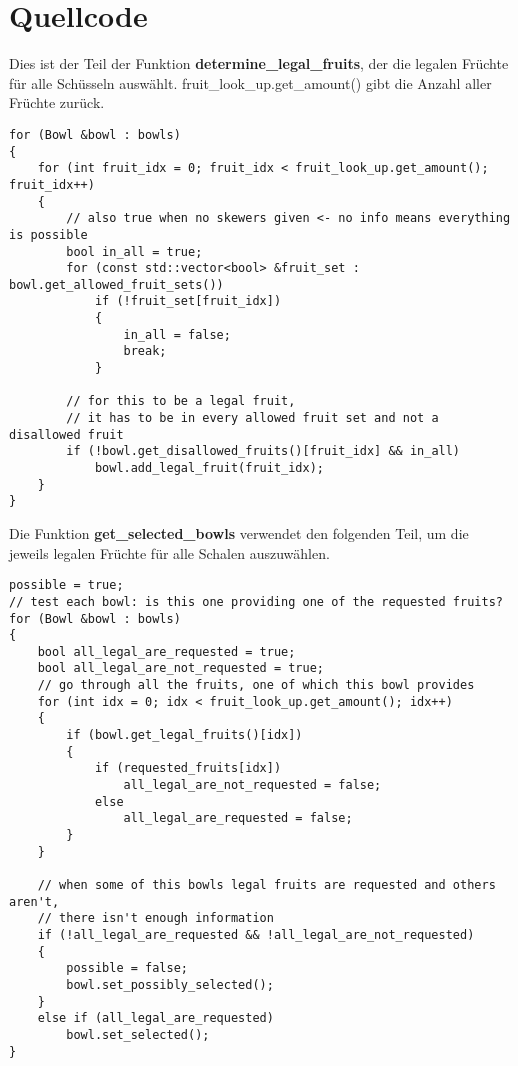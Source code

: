 \documentclass[a4paper,10pt,ngerman]{scrartcl}
\begin{document}
\section{Quellcode}
Dies ist der Teil der Funktion \textbf{determine\_legal\_fruits}, der die legalen Früchte für alle Schüsseln auswählt.
\glqq fruit\_look\_up.get\_amount()\grqq{} gibt die Anzahl aller Früchte zurück.
\begin{lstlisting}
for (Bowl &bowl : bowls)
{
    for (int fruit_idx = 0; fruit_idx < fruit_look_up.get_amount(); fruit_idx++)
    {
        // also true when no skewers given <- no info means everything is possible
        bool in_all = true;
        for (const std::vector<bool> &fruit_set : bowl.get_allowed_fruit_sets())
            if (!fruit_set[fruit_idx])
            {
                in_all = false;
                break;
            }

        // for this to be a legal fruit,
        // it has to be in every allowed fruit set and not a disallowed fruit
        if (!bowl.get_disallowed_fruits()[fruit_idx] && in_all)
            bowl.add_legal_fruit(fruit_idx);
    }
}
\end{lstlisting}

Die Funktion \textbf{get\_selected\_bowls} verwendet den folgenden Teil, um die jeweils legalen Früchte für alle Schalen auszuwählen.
\begin{lstlisting}
possible = true;
// test each bowl: is this one providing one of the requested fruits?
for (Bowl &bowl : bowls)
{
    bool all_legal_are_requested = true;
    bool all_legal_are_not_requested = true;
    // go through all the fruits, one of which this bowl provides
    for (int idx = 0; idx < fruit_look_up.get_amount(); idx++)
    {
        if (bowl.get_legal_fruits()[idx])
        {
            if (requested_fruits[idx])
                all_legal_are_not_requested = false;
            else
                all_legal_are_requested = false;
        }
    }

    // when some of this bowls legal fruits are requested and others aren't,
    // there isn't enough information
    if (!all_legal_are_requested && !all_legal_are_not_requested)
    {
        possible = false;
        bowl.set_possibly_selected();
    }
    else if (all_legal_are_requested)
        bowl.set_selected();
}
\end{lstlisting}
\end{document}
